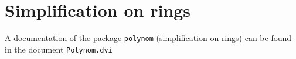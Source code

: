 \section{Simplification on rings}\label{Addoc-polynom}
A documentation of the package {\tt polynom} (simplification on rings)
can be found in the document {\tt Polynom.dvi}




